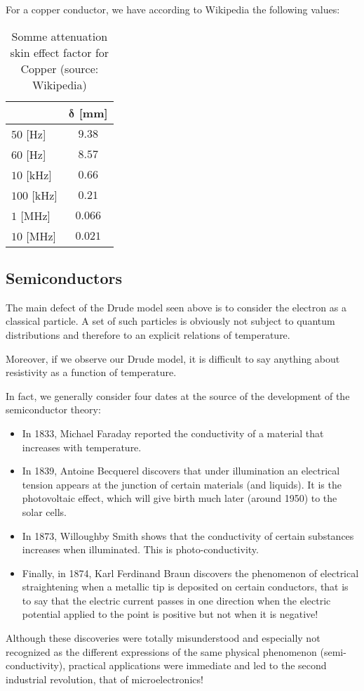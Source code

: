 	For a copper conductor, we have according to Wikipedia the following values:
	\begin{table}[H]
		\centering
		\begin{tabular}{|l|c|}
		\hline
		\rowcolor[HTML]{9B9B9B} 
		\multicolumn{1}{|c|}{\cellcolor[HTML]{9B9B9B}\textbf{Frequency}} & \textbf{$\pmb{\delta}$ [mm]} \\ \hline
		$50$ [Hz] & $9.38$ \\ \hline
		$60$ [Hz] & $8.57$ \\ \hline
		$10$ [kHz] & $0.66$ \\ \hline
		$100$ [kHz] & $0.21$ \\ \hline
		$1$ [MHz] & $0.066$ \\ \hline
		$10$ [MHz] & $0.021$ \\ \hline
		\end{tabular}
		\caption[Some attenuation skin effect factor for Copper]{Somme attenuation skin effect factor for Copper (source: Wikipedia)}
	\end{table}

	\pagebreak
	\subsection{Semiconductors}\label{semiconductors}
	The main defect of the Drude model seen above is to consider the electron as a classical particle. A set of such particles is obviously not subject to quantum distributions and therefore to an explicit relations of temperature.

	Moreover, if we observe our Drude model, it is difficult to say anything about resistivity as a function of temperature.

	In fact, we generally consider four dates at the source of the development of the semiconductor theory:
	\begin{itemize}
		\item In 1833, Michael Faraday reported the conductivity of a material that increases with temperature.

		\item In 1839, Antoine Becquerel discovers that under illumination an electrical tension appears at the junction of certain materials (and liquids). It is the photovoltaic effect, which will give birth much later (around 1950) to the solar cells.

		\item In 1873, Willoughby Smith shows that the conductivity of certain substances increases when illuminated. This is photo-conductivity.

		\item Finally, in 1874, Karl Ferdinand Braun discovers the phenomenon of electrical straightening when a metallic tip is deposited on certain conductors, that is to say that the electric current passes in one direction when the electric potential applied to the point is positive but not when it is negative!
	\end{itemize}
	Although these discoveries were totally misunderstood and especially not recognized as the different expressions of the same physical phenomenon (semi-conductivity), practical applications were immediate and led to the second industrial revolution, that of microelectronics!
	
